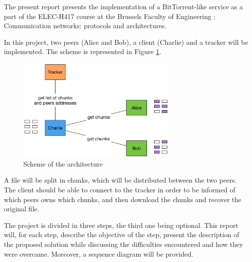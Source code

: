 The present report presents the implementation of a BitTorrent-like service as a part of the ELEC-H417 course at the Brussels Faculty of Engineering : Communication networks: protocols and architectures.

In this project, two peers (Alice and Bob), a client (Charlie) and a tracker will be implemented. The scheme is represented in Figure \ref{fig:scheme}. 

\begin{figure}[h]
    \centering
    \includegraphics[width = 0.7\textwidth]{img/scheme.png}
    \caption{Scheme of the architecture}
    \label{fig:scheme}
\end{figure}

A file will be split in chunks, which will be distributed between the two peers. The client should be able to connect to the tracker in order to be informed of which peers owns which chunks, and then download the chunks and recover the original file.

The project is divided in three steps, the third one being optional. This report will, for each step, describe the objective of the step, present the description of the proposed solution while discussing the difficulties encountered and how they were overcame. Moreover, a sequence diagram will be provided.

